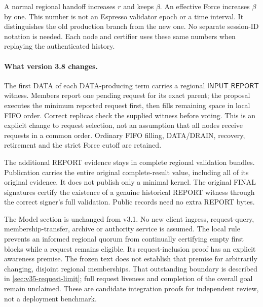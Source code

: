\documentclass[11pt,a4paper]{article}
\newcommand{\tagg}[1]{\ensuremath{\mathsf{#1}}}
\begin{document}
A normal regional handoff increases $r$ and keeps $\beta$.
An effective Force increases $\beta$ by one. This number is not an
Espresso validator epoch or a time interval. It distinguishes the old
production branch from the new one. No separate session-ID notation is
needed. Each node and certifier uses these same numbers when replaying
the authenticated history.

\paragraph{What version 3.8 changes.}
The first DATA of each DATA-producing term carries a regional
\tagg{INPUT\_REPORT} witness. Members report one pending request for
its exact parent; the proposal executes the minimum reported request
first, then fills remaining space in local FIFO order. Correct replicas
check the supplied witness before voting. This is an explicit change
to request selection, not an assumption that all nodes receive requests
in a common order. Ordinary FIFO filling, DATA/DRAIN, recovery,
retirement and the strict Force cutoff are retained.

The additional REPORT evidence stays in complete regional validation
bundles. Publication carries the entire original complete-result value,
including all of its original evidence. It does not publish only a
minimal kernel. The original FINAL signatures certify the existence
of a genuine historical REPORT witness through the correct signer's
full validation. Public records need no extra REPORT bytes.

The Model section is unchanged from v3.1. No new client ingress,
request-query, membership-transfer, archive or authority service is
assumed. The local rule prevents an informed regional quorum from
continually certifying empty first blocks while a request remains
eligible. Its request-inclusion proof has an explicit awareness premise.
The frozen text does not establish that premise for arbitrarily changing,
disjoint regional memberships. That outstanding boundary is described
in \cref{sec:v35-request-limit}; full request liveness and completion of
the overall goal remain unclaimed. These are candidate integration proofs
for independent review, not a deployment benchmark.
\end{document}
